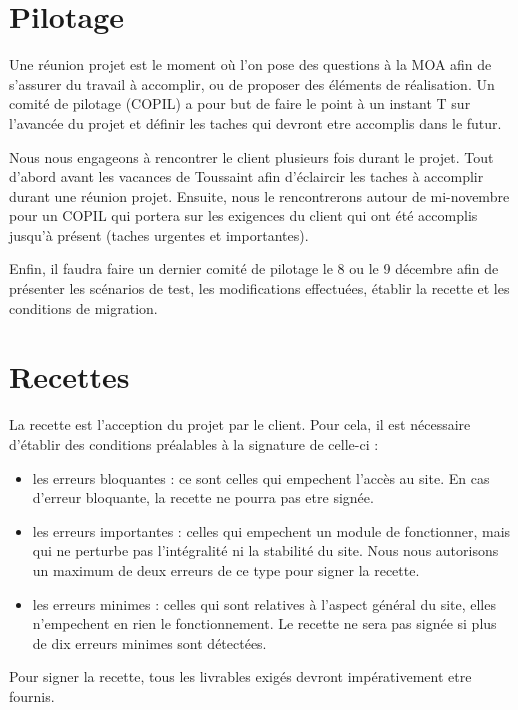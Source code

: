 \documentclass[11pt]{report}
\begin{document}
\section{Pilotage}
 Une réunion projet est le moment où l'on pose des questions à la MOA afin de
s'assurer du travail à accomplir, ou de proposer des éléments de réalisation.
 Un comité de pilotage (COPIL) a pour but de faire le point à un instant T sur
l'avancée du projet et définir les taches qui devront etre accomplis dans le futur. \\

 \par Nous nous engageons à rencontrer le client plusieurs fois durant le
 projet. Tout d'abord avant les vacances de Toussaint afin d'éclaircir les
 taches à accomplir durant une réunion projet. Ensuite, nous le rencontrerons
 autour de mi-novembre pour un COPIL qui portera sur les exigences du client qui
 ont été accomplis jusqu'à présent (taches urgentes et importantes). 
 \par Enfin, il
 faudra faire un dernier comité de pilotage le 8 ou le 9 décembre afin de
 présenter les scénarios de test, les modifications effectuées, établir la
recette et les conditions de migration.
\section{Recettes}
 La recette est l'acception du projet par le client. Pour cela, il est
nécessaire d'établir des conditions préalables à la signature de celle-ci : \\
\begin{itemize}
 \item les erreurs bloquantes : ce sont celles qui empechent l'accès au site.
 En cas d'erreur bloquante, la recette ne pourra pas etre signée. \\
  \item les erreurs importantes : celles qui empechent un module de fonctionner,
  mais qui ne perturbe pas l'intégralité ni la stabilité du site. Nous nous
 autorisons un maximum de deux erreurs de ce type pour signer la recette. \\
  \item les erreurs minimes : celles qui sont relatives à l'aspect général du
  site, elles n'empechent en rien le fonctionnement. Le recette ne sera pas
  signée si plus de dix erreurs minimes sont détectées. \\
\end{itemize}

\par Pour signer la recette, tous les livrables exigés devront impérativement
etre fournis.
\end{document}
